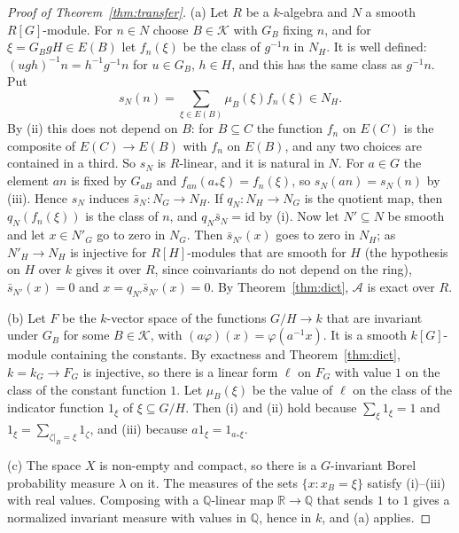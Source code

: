 \documentclass[11pt,a4paper]{article}
\theoremstyle{definition}
\newcommand{\A}{\mathcal{A}}
\newcommand{\K}{\mathcal{K}}
\newcommand{\Q}{\mathbb{Q}}
\newcommand{\R}{\mathbb{R}}
\newcommand{\id}{\mathrm{id}}
\begin{document}
\begin{proof}[Proof of Theorem~\ref{thm:transfer}]
(a) Let $R$ be a $k$-algebra and $N$ a smooth $R[G]$-module. For $n\in N$
choose $B\in\K$ with $G_B$ fixing $n$, and for $\xi=G_BgH\in E(B)$ let
$f_n(\xi)$ be the class of $g^{-1}n$ in $N_H$. It is well defined:
$(ugh)^{-1}n=h^{-1}g^{-1}n$ for $u\in G_B$, $h\in H$, and this has the same
class as $g^{-1}n$. Put
\[
 s_N(n)=\sum_{\xi\in E(B)}\mu_B(\xi)f_n(\xi)\in N_H .
\]
By (ii) this does not depend on $B$: for $B\subseteq C$ the function $f_n$
on $E(C)$ is the composite of $E(C)\to E(B)$ with $f_n$ on $E(B)$, and any
two choices are contained in a third. So $s_N$ is $R$-linear, and it is
natural in $N$. For $a\in G$ the element $an$ is fixed by $G_{aB}$ and
$f_{an}(a_*\xi)=f_n(\xi)$, so $s_N(an)=s_N(n)$ by (iii). Hence $s_N$ induces
$\bar s_N\colon N_G\to N_H$. If $q_N\colon N_H\to N_G$ is the quotient map,
then $q_N(f_n(\xi))$ is the class of $n$, and $q_N\bar s_N=\id$ by (i). Now
let $N'\subseteq N$ be smooth and let $x\in N'_G$ go to zero in $N_G$. Then
$\bar s_{N'}(x)$ goes to zero in $N_H$; as $N'_H\to N_H$ is injective for
$R[H]$-modules that are smooth for $H$ (the hypothesis on $H$ over $k$
gives it over $R$, since coinvariants do not depend on the ring),
$\bar s_{N'}(x)=0$ and $x=q_{N'}\bar s_{N'}(x)=0$. By Theorem~\ref{thm:dict},
$\A$ is exact over $R$.

(b) Let $F$ be the $k$-vector space of the functions $G/H\to k$ that are
invariant under $G_B$ for some $B\in\K$, with $(a\varphi)(x)=\varphi(a^{-1}x)$.
It is a smooth $k[G]$-module containing the constants. By exactness and
Theorem~\ref{thm:dict}, $k=k_G\to F_G$ is injective, so there is a linear
form $\ell$ on $F_G$ with value $1$ on the class of the constant function
$1$. Let $\mu_B(\xi)$ be the value of $\ell$ on the class of the indicator
function $1_\xi$ of $\xi\subseteq G/H$. Then (i) and (ii) hold because
$\sum_\xi1_\xi=1$ and $1_\xi=\sum_{\zeta|_B=\xi}1_\zeta$, and (iii) because
$a1_\xi=1_{a_*\xi}$.

(c) The space $X$ is non-empty and compact, so there is a $G$-invariant
Borel probability measure $\lambda$ on it. The measures of the sets
$\{x:x_B=\xi\}$ satisfy (i)--(iii) with real values. Composing with a
$\Q$-linear map $\R\to\Q$ that sends $1$ to $1$ gives a normalized invariant
measure with values in $\Q$, hence in $k$, and (a) applies.
\end{proof}
\end{document}

